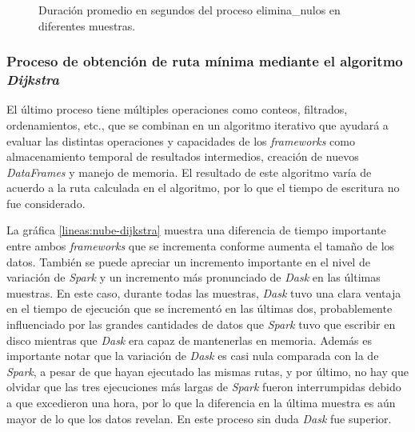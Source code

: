 \begin{figure}
\centering
{}
\caption{Duración promedio en segundos del proceso elimina\_nulos en diferentes muestras.}
\label{lineas:nube-elimina-nulos}
\end{figure}

\subsubsection{Proceso de obtención de ruta mínima mediante el algoritmo \textit{Dijkstra}}

El último proceso tiene múltiples operaciones como conteos, filtrados, ordenamientos, etc., que se combinan en un algoritmo iterativo que ayudará a evaluar las distintas operaciones y capacidades de los \textit{frameworks} como almacenamiento temporal de resultados intermedios, creación de nuevos \textit{DataFrames} y manejo de memoria. El resultado de este algoritmo varía de acuerdo a la ruta calculada en el algoritmo, por lo que el tiempo de escritura no fue considerado.

La gráfica \ref{lineas:nube-dijkstra} muestra una diferencia de tiempo importante entre ambos \textit{frameworks} que se incrementa conforme aumenta el tamaño de los datos. También se puede apreciar un incremento importante en el nivel de variación de \textit{Spark} y un incremento más pronunciado de \textit{Dask} en las últimas muestras. En este caso, durante todas las muestras, \textit{Dask} tuvo una clara ventaja en el tiempo de ejecución que se incrementó en las últimas dos, probablemente influenciado por las grandes cantidades de datos que \textit{Spark} tuvo que escribir en disco mientras que \textit{Dask} era capaz de mantenerlas en memoria. Además es importante notar que la variación de \textit{Dask} es casi nula comparada con la de \textit{Spark}, a pesar de que hayan ejecutado las mismas rutas, y por último, no hay que olvidar que las tres ejecuciones más largas de \textit{Spark} fueron interrumpidas debido a que excedieron una hora, por lo que la diferencia en la última muestra es aún mayor de lo que los datos revelan. En este proceso sin duda \textit{Dask} fue superior.


